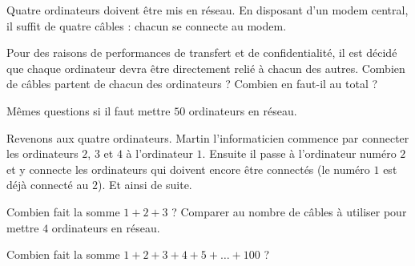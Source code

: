 
\begin{exercice}\label{exosmath-0763}

Quatre ordinateurs doivent être mis en réseau. En disposant d'un modem central, il suffit de quatre câbles : chacun se connecte au modem.

Pour des raisons de performances de transfert et de confidentialité, il est décidé que chaque ordinateur devra être directement relié à chacun des autres. Combien de câbles partent de chacun des ordinateurs ? Combien en faut-il au total ?

Mêmes questions si il faut mettre \( 50\) ordinateurs en réseau.

Revenons aux quatre ordinateurs. Martin l'informaticien commence par connecter les ordinateurs \( 2\), \( 3\) et \( 4\) à l'ordinateur \( 1\). Ensuite il passe à l'ordinateur numéro \( 2\) et y connecte les ordinateurs qui doivent encore être connectés (le numéro \( 1\) est déjà connecté au \( 2\)). Et ainsi de suite.

Combien fait la somme \( 1+2+3\) ? Comparer au nombre de câbles à utiliser pour mettre \( 4\) ordinateurs en réseau.

Combien fait la somme \( 1+2+3+4+5+\ldots+100\) ?
\end{exercice}
